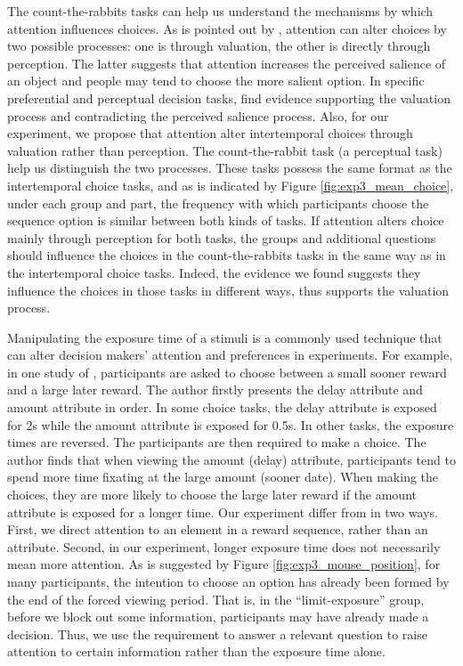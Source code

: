 \documentclass[
  12pt,
]{article}
\begin{document}
The count-the-rabbits tasks can help us understand the mechanisms by
which attention influences choices. As is pointed out by
\citet{pleskac2023attention}, attention can alter choices by two
possible processes: one is through valuation, the other is directly
through perception. The latter suggests that attention increases the
perceived salience of an object and people may tend to choose the more
salient option. In specific preferential and perceptual decision tasks,
\citet{pleskac2023attention} find evidence supporting the valuation
process and contradicting the perceived salience process. Also, for our
experiment, we propose that attention alter intertemporal choices
through valuation rather than perception. The count-the-rabbit task (a
perceptual task) help us distinguish the two processes. These tasks
possess the same format as the intertemporal choice tasks, and as is
indicated by Figure \ref{fig:exp3_mean_choice}, under each group and
part, the frequency with which participants choose the sequence option
is similar between both kinds of tasks. If attention alters choice
mainly through perception for both tasks, the groups and additional
questions should influence the choices in the count-the-rabbits tasks in
the same way as in the intertemporal choice tasks. Indeed, the evidence
we found suggests they influence the choices in those tasks in different
ways, thus supports the valuation process.

Manipulating the exposure time of a stimuli is a commonly used technique
that can alter decision makers' attention and preferences in
experiments. For example, in one study of
\citet{fisher2021intertemporal}, participants are asked to choose
between a small sooner reward and a large later reward. The author
firstly presents the delay attribute and amount attribute in order. In
some choice tasks, the delay attribute is exposed for 2s while the
amount attribute is exposed for 0.5s. In other tasks, the exposure times
are reversed. The participants are then required to make a choice. The
author finds that when viewing the amount (delay) attribute,
participants tend to spend more time fixating at the large amount
(sooner date). When making the choices, they are more likely to choose
the large later reward if the amount attribute is exposed for a longer
time. Our experiment differ from \citet{fisher2021intertemporal} in two
ways. First, we direct attention to an element in a reward sequence,
rather than an attribute. Second, in our experiment, longer exposure
time does not necessarily mean more attention. As is suggested by Figure
\ref{fig:exp3_mouse_position}, for many participants, the intention to
choose an option has already been formed by the end of the forced
viewing period. That is, in the ``limit-exposure'' group, before we
block out some information, participants may have already made a
decision. Thus, we use the requirement to answer a relevant question to
raise attention to certain information rather than the exposure time
alone.
\end{document}
